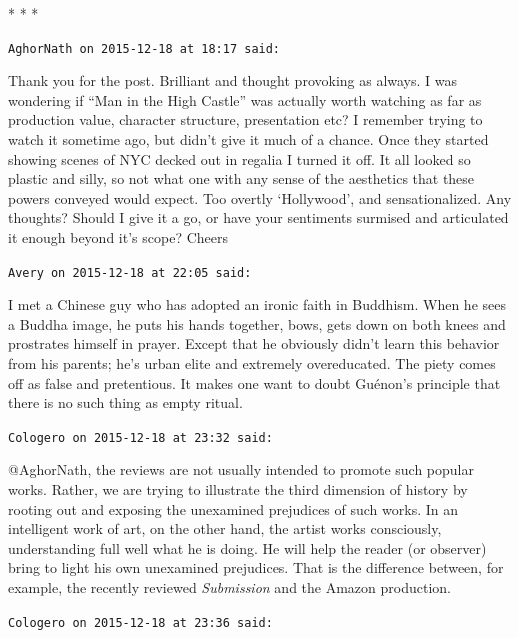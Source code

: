 
\begin{center}* * *\end{center}

\begin{footnotesize}
\begin{sffamily}
\texttt{AghorNath on 2015-12-18 at 18:17 said:}

Thank you for the post. Brilliant and thought provoking as always. I was wondering if ``Man in the High Castle'' was actually worth watching as far as production value, character structure, presentation etc? I remember trying to watch it sometime ago, but didn't give it much of a chance. Once they started showing scenes of NYC decked out in regalia I turned it off. It all looked so plastic and silly, so not what one with any sense of the aesthetics that these powers conveyed would expect. Too overtly `Hollywood', and sensationalized. Any thoughts? Should I give it a go, or have your sentiments surmised and articulated it enough beyond it's scope? Cheers

\hfill

\texttt{Avery on 2015-12-18 at 22:05 said:}

I met a Chinese guy who has adopted an ironic faith in Buddhism. When he sees a Buddha image, he puts his hands together, bows, gets down on both knees and prostrates himself in prayer. Except that he obviously didn't learn this behavior from his parents; he's urban elite and extremely overeducated. The piety comes off as false and pretentious. It makes one want to doubt Guénon's principle that there is no such thing as empty ritual.

\hfill

\texttt{Cologero on 2015-12-18 at 23:32 said:}

@AghorNath, the reviews are not usually intended to promote such popular works. Rather, we are trying to illustrate the third dimension of history by rooting out and exposing the unexamined prejudices of such works. In an intelligent work of art, on the other hand, the artist works consciously, understanding full well what he is doing. He will help the reader (or observer) bring to light his own unexamined prejudices. That is the difference between, for example, the recently reviewed \emph{Submission} and the Amazon production.

\hfill

\texttt{Cologero on 2015-12-18 at 23:36 said:}


\end{sffamily}
\end{footnotesize}
